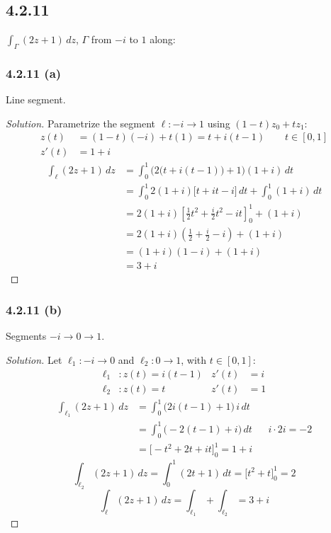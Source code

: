 \documentclass{article}
\newenvironment{solution}{
\begin{proof}[Solution]}{
\end{proof}}
\begin{document}
\subsection*{4.2.11}
$\int_\Gamma (2z + 1)\,dz$, $\Gamma$ from $-i$ to $1$ along:

\subsubsection*{4.2.11 (a)}
Line segment.
\begin{solution}
  Parametrize the segment $\ell: -i \to 1$ using $(1-t)z_0 + tz_1$:
  \begin{align*}
    z(t)  & = (1-t)(-i) + t(1) = t + i(t-1) \qquad t \in [0,1] \\
    z'(t) & = 1+i
  \end{align*}
  \begin{align*}
    \int_\ell (2z+1)\,dz
    & = \int_0^1 \Big(2\big(t + i(t-1)\big) + 1\Big)(1+i)\,dt \\
    & = \int_0^1 2(1+i)\big[t + it - i\big]\,dt + \int_0^1 (1+i)\,dt \\
    & = 2(1+i)\left[\frac{1}{2}t^2 + \frac{i}{2}t^2 - it\right]_0^1 + (1+i) \\
    & = 2(1+i)\left(\frac{1}{2} + \frac{i}{2} - i\right) + (1+i) \\
    & = (1+i)(1-i) + (1+i) \\
    & = 3 + i
  \end{align*}
\end{solution}

\subsubsection*{4.2.11 (b)}
Segments $-i \to 0 \to 1$.
\begin{solution}
  Let $\ell_1: -i \to 0$ and $\ell_2: 0 \to 1$, with $t \in [0,1]$:
  \begin{align*}
    \ell_1 & : z(t) = i(t-1) & z'(t) & = i \\
    \ell_2 & : z(t) = t      & z'(t) & = 1
  \end{align*}
  \begin{align*}
    \int_{\ell_1} (2z+1)\,dz
    & = \int_0^1 \big(2i(t-1) + 1\big)\,i\,dt \\
    & = \int_0^1 \big(-2(t-1) + i\big)\,dt && i \cdot 2i = -2 \\
    & = \Big[-t^2 + 2t + it\Big]_0^1 = 1 + i
  \end{align*}
  \[
    \int_{\ell_2} (2z+1)\,dz = \int_0^1 (2t+1)\,dt = \Big[t^2 + t\Big]_0^1 = 2
  \]
  \[
    \int_\ell (2z+1)\,dz = \int_{\ell_1} + \int_{\ell_2} = 3 + i
  \]
\end{solution}
\end{document}
